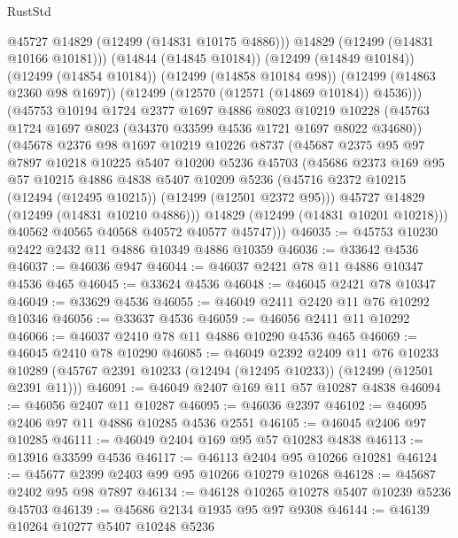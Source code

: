 \begin{lexlean}{RustStd}
\begin{coremodule}
{\begin{coremodule}
{{{{{{{{{{{{{{{{{{{{{{{{{{{{{{{{{{{{{{{{{{{{{{{{{{{{{{{{{{{{{{{{{{{{{{{{{{{{{{{{            @45727
            @14829
            (@12499 (@14831 @10175 @4886)))
          @14829
          (@12499 (@14831 @10166 @10181)))
        (@14844 (@14845 @10184))
        (@12499 (@14849 @10184))
        (@12499 (@14854 @10184))
        (@12499 (@14858 @10184 @98))
        (@12499 (@14863 @2360 @98 @1697))
        (@12499 (@12570 (@12571 (@14869 @10184)) @4536)))
      (@45753
        @10194
        @1724
        @2377
        @1697
        @4886
        @8023
        @10219
        @10228
        (@45763 @1724 @1697 @8023 (@34370 @33599 @4536 @1721 @1697 @8022 @34680))
        (@45678
          @2376
          @98
          @1697
          @10219
          @10226
          @8737
          (@45687
            @2375
            @95
            @97
            @7897
            @10218
            @10225
            @5407
            @10200
            @5236
            @45703
            (@45686
              @2373
              @169
              @95
              @57
              @10215
              @4886
              @4838
              @5407
              @10209
              @5236
              (@45716 @2372 @10215 (@12494 (@12495 @10215)) (@12499 (@12501 @2372 @95)))
              @45727
              @14829
              (@12499 (@14831 @10210 @4886)))
            @14829
            (@12499 (@14831 @10201 @10218)))
          @40562
          @40565
          @40568
          @40572
          @40577
          @45747)))
@46035 := @45753 @10230 @2422 @2432 @11 @4886 @10349 @4886 @10359
@46036 := @33642 @4536
@46037 := @46036 @947
@46044 := @46037 @2421 @78 @11 @4886 @10347 @4536 @465
@46045 := @33624 @4536
@46048 := @46045 @2421 @78 @10347
@46049 := @33629 @4536
@46055 := @46049 @2411 @2420 @11 @76 @10292 @10346
@46056 := @33637 @4536
@46059 := @46056 @2411 @11 @10292
@46066 := @46037 @2410 @78 @11 @4886 @10290 @4536 @465
@46069 := @46045 @2410 @78 @10290
@46085 := @46049
    @2392
    @2409
    @11
    @76
    @10233
    @10289
    (@45767 @2391 @10233 (@12494 (@12495 @10233)) (@12499 (@12501 @2391 @11)))
@46091 := @46049 @2407 @169 @11 @57 @10287 @4838
@46094 := @46056 @2407 @11 @10287
@46095 := @46036 @2397
@46102 := @46095 @2406 @97 @11 @4886 @10285 @4536 @2551
@46105 := @46045 @2406 @97 @10285
@46111 := @46049 @2404 @169 @95 @57 @10283 @4838
@46113 := @13916 @33599 @4536
@46117 := @46113 @2404 @95 @10266 @10281
@46124 := @45677 @2399 @2403 @99 @95 @10266 @10279 @10268
@46128 := @45687 @2402 @95 @98 @7897
@46134 := @46128 @10265 @10278 @5407 @10239 @5236 @45703
@46139 := @45686 @2134 @1935 @95 @97 @9308
@46144 := @46139 @10264 @10277 @5407 @10248 @5236
}}}}}}}}}}}}}}}}}}}}}}}}}}}}}}}}}}}}}}}}}}}}}}}}}}}}}}}}}}}}}}}}}}}}}}}}}}}}}}}}
\end{coremodule}}
\end{coremodule}
\end{lexlean}
